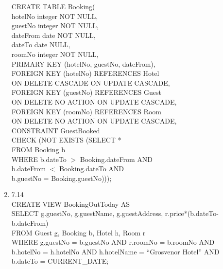 \documentclass[10pt]{article}
\begin{document}
\begin{enumerate}
  CREATE TABLE Booking(\\
  \-\hspace{2em}hotelNo integer NOT NULL,\\
  \-\hspace{2em}guestNo integer NOT NULL,\\
  \-\hspace{2em}dateFrom date NOT NULL,\\
  \-\hspace{2em}dateTo date NULL,\\
  \-\hspace{2em}roomNo integer NOT NULL,\\
  \-\hspace{2em}PRIMARY KEY (hotelNo, guestNo, dateFrom),\\
  \-\hspace{2em}FOREIGN KEY (hotelNo) REFERENCES Hotel\\
  \-\hspace{2em}ON DELETE CASCADE ON UPDATE CASCADE,\\
  \-\hspace{2em}FOREIGN KEY (guestNo) REFERENCES Guest\\
  \-\hspace{2em}ON DELETE NO ACTION ON UPDATE CASCADE,\\
  \-\hspace{2em}FOREIGN KEY (roomNo) REFERENCES Room\\
  \-\hspace{2em}ON DELETE NO ACTION ON UPDATE CASCADE,\\
  \-\hspace{2em}CONSTRAINT GuestBooked\\
  \-\hspace{2em}CHECK (NOT EXISTS (SELECT *\\
  \-\hspace{13.5em}FROM Booking b\\
  \-\hspace{13.5em}WHERE b.dateTo $>$ Booking.dateFrom AND\\
  \-\hspace{13.5em}b.dateFrom $<$ Booking.dateTo AND\\
  \-\hspace{13.5em}b.guestNo = Booking.guestNo)));

\item 7.14\\
  CREATE VIEW BookingOutToday AS\\
  \-\hspace{2em}SELECT g.guestNo, g.guestName, g.guestAddress,
  r.price*(b.dateTo-b.dateFrom)\\
  \-\hspace{2em}FROM Guest g, Booking b, Hotel h, Room r\\
  \-\hspace{2em}WHERE g.guestNo = b.guestNo AND r.roomNo = b.roomNo AND\\
  \-\hspace{2em}b.hotelNo = h.hotelNo AND h.hotelName = ``Grosvenor Hotel'' AND\\
  \-\hspace{2em}b.dateTo = CURRENT\_DATE;


\end{enumerate}
\end{document}
